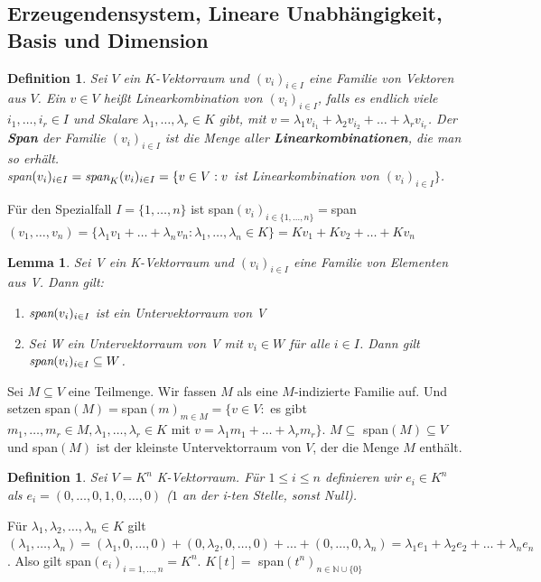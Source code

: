 \documentclass[12pt,a4paper]{article}
\theoremstyle{plain}
\newtheorem{Lemma}[Theorem]{Lemma}
\newtheorem{Definition}[Theorem]{Definition}
\newcommand{\herv}[1]{{\emph{\textbf{#1}}}}
\newcommand{\N}{\mathbb{N}}
\numberwithin{equation}{section}
\begin{document}
\subsection{Erzeugendensystem, Lineare Unabhängigkeit, Basis und Dimension}
\begin{Definition}
Sei $V$ ein $K$-Vektorraum und $(v_i)_{i\in I}$ eine Familie von Vektoren aus $V$. Ein $v\in V$ heißt Linearkombination von $(v_i)_{i\in I}$, falls es endlich viele $i_1,\ldots,i_r\in I$ und Skalare $\lambda_1,\ldots,\lambda_r\in K$ gibt, mit $v=\lambda_1 v_{i_1}+\lambda_2 v_{i_2}+\ldots+\lambda_r v_{i_r}$. Der \herv{Span} der Familie $(v_i)_{i\in I}$ ist die Menge aller \herv{Linearkombinationen}, die man so erhält.\\
\emph{span}$(v_i)_{i\in I} = \emph{span}_K(v_i)_{i\in I}= \{v\in V: v$ ist Linearkombination von $(v_i)_{i\in I} \}$. 
\end{Definition}
Für den Spezialfall $I=\{1,\ldots,n\}$ ist span$(v_i)_{i\in \{1,\ldots,n\}}=$span$(v_1,\ldots,v_n)=\{\lambda_1 v_1 + \ldots + \lambda_n v_n : \lambda_1,\ldots,\lambda_n\in K\}=Kv_1+Kv_2+\ldots+Kv_n$
\begin{Lemma}
Sei V ein K-Vektorraum und $(v_i)_{i\in I}$ eine Familie von Elementen aus V. Dann gilt:
\begin{enumerate}
\renewcommand{\labelenumi}{\emph{\alph{enumi})}}
\item $\emph{span}(v_i)_{i\in I}$ ist ein Untervektorraum von V
\item Sei W ein Untervektorraum von V mit $v_i\in W$ für alle $i\in I$. Dann gilt $\emph{span}(v_i)_{i\in I}\subseteq W$.
\end{enumerate}
\end{Lemma}
Sei $M\subseteq V$ eine Teilmenge. Wir fassen $M$ als eine $M$-indizierte Familie auf. Und setzen span$(M)=$span$(m)_{m\in M}=\{v\in V:$ es gibt $m_1,\ldots,m_r\in M, \lambda_1,\ldots,\lambda_r\in K$ mit $v=\lambda_1m_1+\ldots+\lambda_rm_r\}$. $M\subseteq$ span$(M)\subseteq V$ und span$(M)$ ist der kleinste Untervektorraum von $V$, der die Menge $M$ enthält.
\begin{Definition}
Sei $V=K^n$ K-Vektorraum. Für $1\leq i\leq n$ definieren wir $e_i\in K^n$ als $e_i=(0,\ldots,0,1,0,\ldots,0)$ ($1$ an der i-ten Stelle, sonst Null).
\end{Definition}
Für $\lambda_1,\lambda_2,\ldots,\lambda_n\in K$ gilt $(\lambda_1,\ldots,\lambda_n)=(\lambda_1,0,\ldots,0)+(0,\lambda_2,0,\ldots,0)+\ldots+(0,\ldots,0,\lambda_n)=\lambda_1e_1+\lambda_2e_2+\ldots+\lambda_ne_n$. Also gilt span$(e_i)_{i=1,\ldots,n}=K^n$. $K[t]=$ span$(t^n)_{n\in\N\cup \{0\}}$ \\
\end{document}
